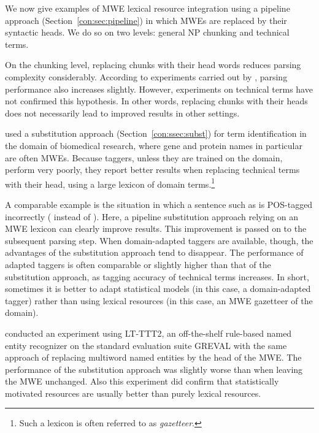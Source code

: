 \documentclass[output=paper]{langsci/langscibook}
\begin{document}
We now give examples of MWE lexical resource integration using a pipeline approach (Section~\ref{con:sec:pipeline}) in which MWEs are replaced by their syntactic heads. We do so on two levels: general NP chunking and technical terms.


On the chunking level, replacing chunks with their head words reduces parsing complexity considerably. 
According to experiments carried out by \citet{prins05}, parsing performance also increases slightly. 
However, experiments on technical terms have not confirmed this hypothesis.
In other words, replacing chunks with their heads does not necessarily lead to improved results in other settings. 


\citet{weeds-ea07} used a substitution approach (Section~\ref{con:ssec:subst}) for term identification in the domain of biomedical research, where gene and protein names in particular are often MWEs. Because taggers, unless they are trained on the domain, perform very poorly, they report better results when replacing technical terms with their head, using a large lexicon of domain terms.\footnote{Such a lexicon is often referred to as \emph{gazetteer}.}

A comparable example is the situation in which a sentence such as 
%
%
is POS-tagged incorrectly ( instead of ). Here, a pipeline substitution approach relying on an MWE lexicon can clearly improve results. This improvement is passed on to the subsequent parsing step. 
When domain-adapted taggers are available, though, the advantages of the substitution approach tend to disappear. 
The performance of adapted taggers is often comparable or slightly higher than that of the substitution approach, as tagging accuracy of technical terms increases. 
In short, sometimes it is better to adapt statistical models (in this case, a domain-adapted tagger) rather than using lexical resources (in this case, an MWE gazetteer of the domain).%

\citet{schneider:2014} conducted an experiment using LT-TTT2, an off-the-shelf rule-based named entity recognizer \citep{grover08} on the standard evaluation suite GREVAL \citep{carroll-ea04} with the same approach of replacing multiword named entities by the head of the MWE. The performance of the substitution approach was slightly worse than when leaving the MWE unchanged. %
Also this experiment did confirm that statistically motivated resources are usually better than purely lexical resources.
\end{document}
